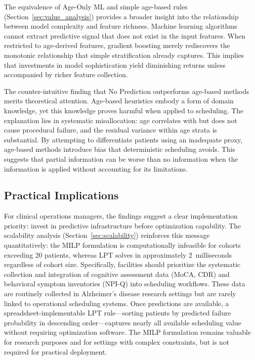 \documentclass[11pt,a4paper]{article}
\begin{document}
The equivalence of Age-Only ML and simple age-based rules (Section~\ref{sec:value_analysis}) provides a broader insight into the relationship between model complexity and feature richness. Machine learning algorithms cannot extract predictive signal that does not exist in the input features. When restricted to age-derived features, gradient boosting merely rediscovers the monotonic relationship that simple stratification already captures. This implies that investments in model sophistication yield diminishing returns unless accompanied by richer feature collection.

The counter-intuitive finding that No Prediction outperforms age-based methods merits theoretical attention. Age-based heuristics embody a form of domain knowledge, yet this knowledge proves harmful when applied to scheduling. The explanation lies in systematic misallocation: age correlates with but does not cause procedural failure, and the residual variance within age strata is substantial. By attempting to differentiate patients using an inadequate proxy, age-based methods introduce bias that deterministic scheduling avoids. This suggests that partial information can be worse than no information when the information is applied without accounting for its limitations.

\subsection{Practical Implications}

For clinical operations managers, the findings suggest a clear implementation priority: invest in predictive infrastructure before optimization capability. The scalability analysis (Section~\ref{sec:scalability}) reinforces this message quantitatively: the MILP formulation is computationally infeasible for cohorts exceeding 20 patients, whereas LPT solves in approximately 2~milliseconds regardless of cohort size. Specifically, facilities should prioritize the systematic collection and integration of cognitive assessment data (MoCA, CDR) and behavioral symptom inventories (NPI-Q) into scheduling workflows. These data are routinely collected in Alzheimer's disease research settings but are rarely linked to operational scheduling systems. Once predictions are available, a spreadsheet-implementable LPT rule---sorting patients by predicted failure probability in descending order---captures nearly all available scheduling value without requiring optimization software. The MILP formulation remains valuable for research purposes and for settings with complex constraints, but is not required for practical deployment.
\end{document}
